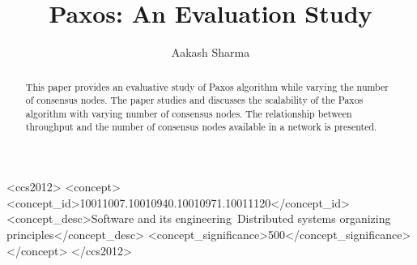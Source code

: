 \documentclass[sigconf]{acmart}
\begin{document}
\title{Paxos: An Evaluation Study}


\author{Aakash Sharma}


\renewcommand{\shortauthors}{Aakash Sharma}


\begin{abstract}
This paper provides an evaluative study of Paxos algorithm while varying the number of consensus nodes. 
The paper studies and discusses the scalability of the Paxos algorithm with varying number of consensus nodes. 
The relationship between throughput and the number of consensus nodes available in a network is presented. 
\end{abstract}

%
%
\begin{CCSXML}
<ccs2012>
<concept>
<concept_id>10011007.10010940.10010971.10011120</concept_id>
<concept_desc>Software and its engineering~Distributed systems organizing principles</concept_desc>
<concept_significance>500</concept_significance>
</concept>
</ccs2012>
\end{CCSXML}





\maketitle





\end{document}
